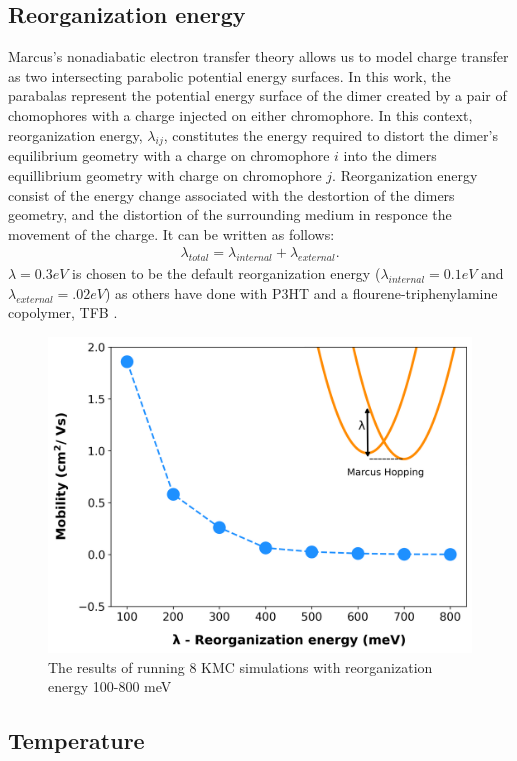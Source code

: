 \subsection{Reorganization energy}
Marcus's nonadiabatic electron transfer theory allows us to model charge transfer as two
intersecting parabolic potential energy surfaces. In this work, the parabalas represent the potential energy surface
of the dimer created by a pair of chomophores with a charge injected on either chromophore. In this context, 
reorganization energy, $\lambda_{ij}$, constitutes the energy required to distort the dimer's equilibrium geometry with a
charge on chromophore $i$ into the dimers equillibrium geometry with charge on chromophore $j$.
Reorganization energy consist of the energy change associated with the destortion of the dimers geometry,
and the distortion of the surrounding medium in responce the movement of the charge. It can be written as
follows:
\begin{align}
    \lambda_{total} = \lambda_{internal} + \lambda_{external}.
\end{align} 
$\lambda = 0.3eV$ is chosen to be the default reorganization energy ($\lambda_{internal} = 0.1eV$
and $\lambda_{external} = .02eV$) as others have done with P3HT \cite{jones2017} and
a flourene-triphenylamine copolymer, TFB \cite{Gali2017}. 

\begin{figure}
  \center
  \includegraphics[width=0.8\linewidth]{figures/reorg.png} 
    \caption{The results of running 8 KMC simulations with reorganization energy 100-800 meV}
  \label{fig:reorg}
\end{figure}

\subsection{Temperature}

